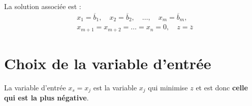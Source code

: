 \documentclass{report}
\begin{document}
\begin{multicols*}{2}
\begin{table}[H]
    \centering
    \renewcommand{\arraystretch}{1.5}
    \selectfont
    \footnotesize
\end{table}

La solution associée est :
\begin{align*}
    &x_1 = \overline{b}_1,\quad x_2 = \overline{b}_2,\quad \dots,\quad
    x_m = \overline{b}_m, \\
    &x_{m+1} = x_{m+2} = \dots = x_n = 0,\quad z = \overline{z}
\end{align*}

\section{Choix de la variable d'entrée}

La variable d'entrée $x_s = x_j$ est la variable $x_j$ qui minimise 
$z$ et est donc \textbf{celle qui est la plus négative}.   


\end{multicols*}
\end{document}
